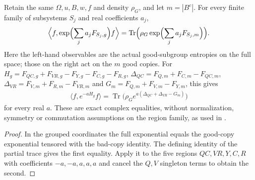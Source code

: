 \begin{theorem}
\label{thm:replica_good_configuration_exponential_expectation}
\leanok
Retain the same $\Omega,u,B,w,f$ and density $\rho_G$, and let
$m=|B^c|$. For every finite family of subsystems $S_j$ and real
coefficients $a_j$,
\begin{align*}
 \Bigl\langle f,\exp\Bigl(\sum_j a_jF_{S_j,g}\Bigr)f\Bigr\rangle
 =\operatorname{Tr}\Bigl(\rho_G
       \exp\Bigl(\sum_j a_jF_{S_j,m}\Bigr)\Bigr).
\end{align*}
Here the left-hand observables are the actual good-subgroup entropies
on the full space; those on the right act on the $m$ good copies.
For $H_g=F_{QC,g}+F_{VR,g}-F_{Y,g}-F_{C,g}-F_{R,g}$,
$\Delta_{QC}=F_{Q,m}+F_{C,m}-F_{QC,m}$,
$\Delta_{VR}=F_{V,m}+F_{R,m}-F_{VR,m}$ and
$G_m=F_{Q,m}+F_{V,m}-F_{Y,m}$, this gives
\begin{align*}
 \langle f,e^{-aH_g}f\rangle
 =\operatorname{Tr}\bigl(\rho_Ge^{a(\Delta_{QC}+\Delta_{VR}-G_m)}\bigr)
\end{align*}
for every real $a$. These are exact complex equalities, without
normalization, symmetry or commutation assumptions on the region
family, as used in
\cite[Section~8, lines~454--560]{OpenAI2026AreaLaw}.
\end{theorem}
\begin{proof}\leanok
{}
In the grouped coordinates the full exponential equals the good-copy
exponential tensored with the bad-copy identity. The defining identity
of the partial trace gives the first equality. Apply it to the five
regions $QC,VR,Y,C,R$ with coefficients $-a,-a,a,a,a$ and cancel
the $Q,V$ singleton terms to obtain the second.
\end{proof}
